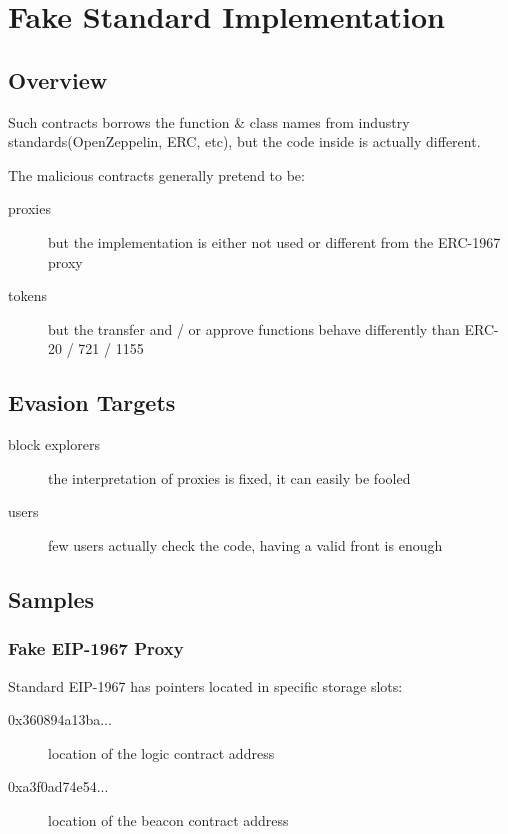 \section{Fake Standard Implementation} \label{sec:fake-implementation}

\subsection{Overview}

Such contracts borrows the function \& class names from industry standards(OpenZeppelin, ERC, etc), but the code inside is actually different.

The malicious contracts generally pretend to be:

\begin{description}
\item[proxies]{but the implementation is either not used or different from the ERC-1967 proxy}
\item[tokens]{but the transfer and / or approve functions behave differently than ERC-20 / 721 / 1155}
\end{description}

\subsection{Evasion Targets}

\begin{description}
\item[block explorers]{the interpretation of proxies is fixed, it can easily be fooled}
\item[users]{few users actually check the code, having a valid front is enough}
\end{description}

\subsection{Samples}

\subsubsection{Fake EIP-1967 Proxy}

Standard EIP-1967 \cite{eip-1967} has pointers located in specific storage slots:

\begin{description}
\item[0x360894a13ba...]{location of the logic contract address}
\item[0xa3f0ad74e54...]{location of the beacon contract address}
\end{description}

